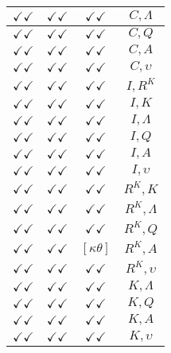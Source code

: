 \documentclass[a4paper,10pt]{article}
\begin{document}
\begin{longtable}{|c|c|c|c|}
\hline
$\checkmark\checkmark$ & $\checkmark\checkmark$ & $\checkmark\checkmark$ & ${C},{\Lambda}$ \\
\hline
$\checkmark\checkmark$ & $\checkmark\checkmark$ & $\checkmark\checkmark$ & ${C},{Q}$ \\
\hline
$\checkmark\checkmark$ & $\checkmark\checkmark$ & $\checkmark\checkmark$ & ${C},{A}$ \\
\hline
$\checkmark\checkmark$ & $\checkmark\checkmark$ & $\checkmark\checkmark$ & ${C},{\upsilon}$ \\
\hline
$\checkmark\checkmark$ & $\checkmark\checkmark$ & $\checkmark\checkmark$ & ${I},{R^{K}}$ \\
\hline
$\checkmark\checkmark$ & $\checkmark\checkmark$ & $\checkmark\checkmark$ & ${I},{K}$ \\
\hline
$\checkmark\checkmark$ & $\checkmark\checkmark$ & $\checkmark\checkmark$ & ${I},{\Lambda}$ \\
\hline
$\checkmark\checkmark$ & $\checkmark\checkmark$ & $\checkmark\checkmark$ & ${I},{Q}$ \\
\hline
$\checkmark\checkmark$ & $\checkmark\checkmark$ & $\checkmark\checkmark$ & ${I},{A}$ \\
\hline
$\checkmark\checkmark$ & $\checkmark\checkmark$ & $\checkmark\checkmark$ & ${I},{\upsilon}$ \\
\hline
$\checkmark\checkmark$ & $\checkmark\checkmark$ & $\checkmark\checkmark$ & ${R^{K}},{K}$ \\
\hline
$\checkmark\checkmark$ & $\checkmark\checkmark$ & $\checkmark\checkmark$ & ${R^{K}},{\Lambda}$ \\
\hline
$\checkmark\checkmark$ & $\checkmark\checkmark$ & $\checkmark\checkmark$ & ${R^{K}},{Q}$ \\
\hline
$\checkmark\checkmark$ & $\checkmark\checkmark$ & $[\kappa \theta ]$ & ${R^{K}},{A}$ \\
\hline
$\checkmark\checkmark$ & $\checkmark\checkmark$ & $\checkmark\checkmark$ & ${R^{K}},{\upsilon}$ \\
\hline
$\checkmark\checkmark$ & $\checkmark\checkmark$ & $\checkmark\checkmark$ & ${K},{\Lambda}$ \\
\hline
$\checkmark\checkmark$ & $\checkmark\checkmark$ & $\checkmark\checkmark$ & ${K},{Q}$ \\
\hline
$\checkmark\checkmark$ & $\checkmark\checkmark$ & $\checkmark\checkmark$ & ${K},{A}$ \\
\hline
$\checkmark\checkmark$ & $\checkmark\checkmark$ & $\checkmark\checkmark$ & ${K},{\upsilon}$ \\

\end{longtable}
\end{document}

